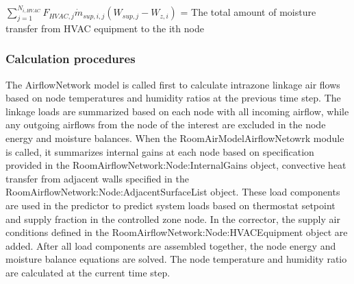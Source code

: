 \({\sum\limits_{j = 1}^{N_{i,HVAC}} F_{HVAC,j} \dot m_{sup,i,j} \left( W_{sup,j} - W_{z,i}\right)}\) = The total amount of moisture transfer from HVAC equipment to the ith node

\subsubsection{Calculation procedures}\label{calculation-procedures}

The AirflowNetwork model is called first to calculate intrazone linkage air flows based on node temperatures and humidity ratios at the previous time step. The linkage loads are summarized based on each node with all incoming airflow, while any outgoing airflows from the node of the interest are excluded in the node energy and moisture balances. When the RoomAirModelAirflowNetowrk module is called, it summarizes internal gains at each node based on specification provided in the RoomAirflowNetwork:Node:InternalGains object, convective heat transfer from adjacent walls specified in the RoomAirflowNetwork:Node:AdjacentSurfaceList object. These load components are used in the predictor to predict system loads based on thermostat setpoint and supply fraction in the controlled zone node. In the corrector, the supply air conditions defined in the RoomAirflowNetwork:Node:HVACEquipment object are added. After all load components are assembled together, the node energy and moisture balance equations are solved. The node temperature and humidity ratio are calculated at the current time step.  
